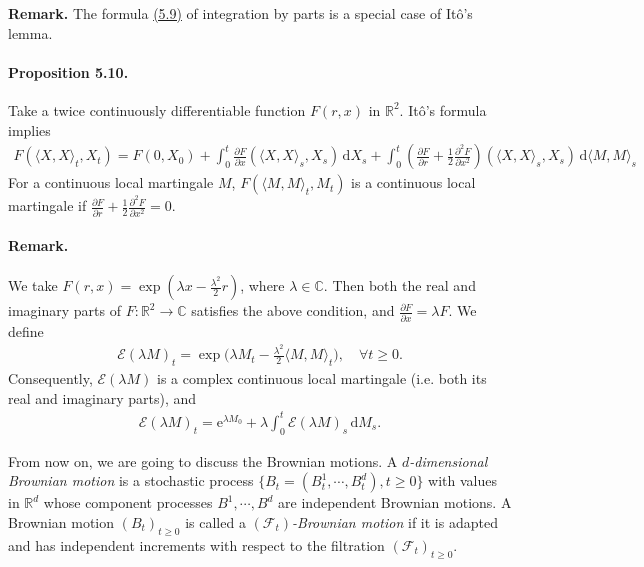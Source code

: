 \documentclass{article}
\numberwithin{equation}{section}
\renewcommand{\d}{\mathrm{d}}
\theoremstyle{plain}
\theoremstyle{definition}
\begin{document}
\noindent\textbf{Remark.} The formula \hyperref[eq:5.9]{(5.9)} of integration by parts is a special case of Itô's lemma.

\paragraph{Proposition 5.10.\label{prop:5.10}} Take a twice continuously differentiable function $F(r,x)$ in $\mathbb{R}^2$. Itô's formula implies
\begin{align*}
	F(\langle X,X\rangle_t,X_t)=F(0,X_0)+\int_0^t\frac{\partial F}{\partial x}(\langle X,X\rangle_s,X_s)\,\d X_s + \int_0^t\left(\frac{\partial F}{\partial r}+\frac{1}{2}\frac{\partial^2F}{\partial x^2}\right)(\langle X,X\rangle_s,X_s)\,\d \langle M,M\rangle_s
\end{align*}
For a continuous local martingale $M$, $F(\langle M,M\rangle_t,M_t)$ is a continuous local martingale if $\frac{\partial F}{\partial r}+\frac{1}{2}\frac{\partial^2F}{\partial x^2}=0$.

\paragraph{Remark.} We take $F(r,x)=\exp(\lambda x-\frac{\lambda^2}{2}r)$, where $\lambda\in\mathbb{C}$. Then both the real and imaginary parts of $F:\mathbb{R}^2\to\mathbb{C}$ satisfies the above condition, and $\frac{\partial F}{\partial x}=\lambda F$. We define
\begin{align*}
	\mathscr{E}(\lambda M)_t = \exp\biggl(\lambda M_t - \frac{\lambda^2}{2}\langle M,M\rangle_t\biggr),\quad \forall t\geq 0.
\end{align*}
Consequently, $\mathscr{E}(\lambda M)$ is a complex continuous local martingale (i.e. both its real and imaginary parts), and
\begin{align*}
	\mathscr{E}(\lambda M)_t = \mathrm{e}^{\lambda M_0} + \lambda\int_0^t\mathscr{E}(\lambda M)_s\,\d M_s.
\end{align*}

From now on, we are going to discuss the Brownian motions. A \textit{$d$-dimensional Brownian motion} is a stochastic process $\{B_t=(B_t^1,\cdots,B_t^d),t\geq 0\}$ with values in $\mathbb{R}^d$ whose component processes $B^1,\cdots,B^d$ are independent Brownian motions. A Brownian motion $(B_t)_{t\geq 0}$ is called a \textit{$(\mathscr{F}_t)$-Brownian motion} if it is adapted and has independent increments with respect to the filtration $(\mathscr{F}_t)_{t\geq 0}$.
\end{document}
